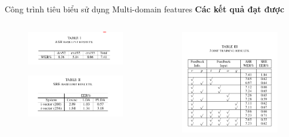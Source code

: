 \documentclass[notheorems, aspectratio=54]{beamer}
\begin{document}
\begin{frame}{Công trình tiêu biểu sử dụng Multi-domain features}
	\textbf{Các kết quả đạt được}
	\begin{columns}
		\begin{column}{0.5\textwidth}
			\begin{figure}[H]
				\includegraphics[width=1\linewidth]{images/multi-task-recurrent-model-asr-baseline-res.png}
			\end{figure}
			\begin{figure}[H]
				\includegraphics[width=1\linewidth]{images/multi-task-recurrent-model-sre-baseline-res.png}
			\end{figure}
		\end{column}
		\begin{column}{0.5\textwidth}
			\begin{figure}[H]
				\includegraphics[width=1\linewidth]{images/multi-task-recurrent-model-joint-training-res.png}

\end{figure}
\end{column}
\end{columns}
\end{frame}
\end{document}
